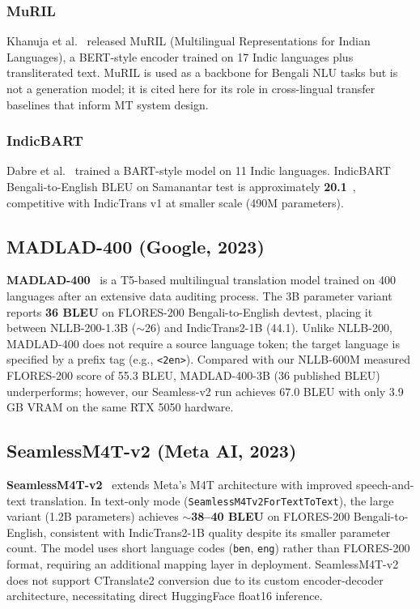 \documentclass[conference]{IEEEtran}
\begin{document}
\subsubsection{MuRIL}
Khanuja et al.~\cite{khanuja2021muril} released MuRIL
(Multilingual Representations for Indian Languages), a BERT-style encoder
trained on 17 Indic languages plus transliterated text.
MuRIL is used as a backbone for Bengali NLU tasks but is not a generation
model; it is cited here for its role in cross-lingual transfer baselines
that inform MT system design.

\subsubsection{IndicBART}
Dabre et al.~\cite{dabre2022indicbart} trained a BART-style model on 11
Indic languages.
IndicBART Bengali-to-English BLEU on Samanantar test is approximately
\textbf{20.1}~\cite{dabre2022indicbart}, competitive with IndicTrans v1
at smaller scale (490M parameters).

\subsection{MADLAD-400 (Google, 2023)}

\textbf{MADLAD-400}~\cite{kudugunta2023madlad} is a T5-based multilingual translation model
trained on 400 languages after an extensive data auditing process.
The 3B parameter variant reports \textbf{36 BLEU} on FLORES-200 Bengali-to-English
devtest, placing it between NLLB-200-1.3B ($\sim$26) and IndicTrans2-1B (44.1).
Unlike NLLB-200, MADLAD-400 does not require a source language token;
the target language is specified by a prefix tag (e.g., \texttt{<2en>}).
Compared with our NLLB-600M measured FLORES-200 score of 55.3 BLEU, MADLAD-400-3B
(36 published BLEU) underperforms; however, our Seamless-v2 run achieves 67.0 BLEU
with only 3.9 GB VRAM on the same RTX 5050 hardware.

\subsection{SeamlessM4T-v2 (Meta AI, 2023)}

\textbf{SeamlessM4T-v2}~\cite{seamlessm4t2023} extends Meta's M4T architecture with
improved speech-and-text translation.
In text-only mode (\texttt{SeamlessM4Tv2ForTextToText}), the large variant (1.2B parameters)
achieves $\sim$\textbf{38--40 BLEU} on FLORES-200 Bengali-to-English,
consistent with IndicTrans2-1B quality despite its smaller parameter count.
The model uses short language codes (\texttt{ben}, \texttt{eng}) rather than FLORES-200
format, requiring an additional mapping layer in deployment.
SeamlessM4T-v2 does not support CTranslate2 conversion due to its custom encoder-decoder
architecture, necessitating direct HuggingFace float16 inference.
\end{document}
